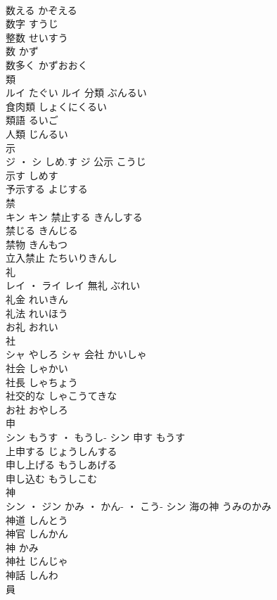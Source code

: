 \documentclass[8pt]{extreport}
\begin{document}
\begin{CJK}{UTF8}{min}
\\	数える	かぞえる	
\\	数字	すうじ	
\\	整数	せいすう	
\\	数	かず	
\\	数多く	かずおおく	
\\	類	
\\	ルイ	たぐい	ルイ	分類	ぶんるい	
\\	食肉類	しょくにくるい	
\\	類語	るいご	
\\	人類	じんるい	
\\	示	
\\	ジ ・ シ	しめ.す	ジ	公示	こうじ	
\\	示す	しめす	
\\	予示する	よじする	
\\	禁	
\\	キン		キン	禁止する	きんしする	
\\	禁じる	きんじる	
\\	禁物	きんもつ	
\\	立入禁止	たちいりきんし	
\\	礼	
\\	レイ ・ ライ		レイ	無礼	ぶれい	
\\	礼金	れいきん	
\\	礼法	れいほう	
\\	お礼	おれい	
\\	社	
\\	シャ	やしろ	シャ	会社	かいしゃ	
\\	社会	しゃかい	
\\	社長	しゃちょう	
\\	社交的な	しゃこうてきな	
\\	お社	おやしろ	
\\	申	
\\	シン	もうす ・ もうし-	シン	申す	もうす	
\\	上申する	じょうしんする	
\\	申し上げる	もうしあげる	
\\	申し込む	もうしこむ	
\\	神	
\\	シン ・ ジン	かみ ・ かん- ・ こう-	シン	海の神	うみのかみ	
\\	神道	しんとう	
\\	神官	しんかん	
\\	神	かみ	
\\	神社	じんじゃ	
\\	神話	しんわ	
\\	員	

\end{CJK}
\end{document}
